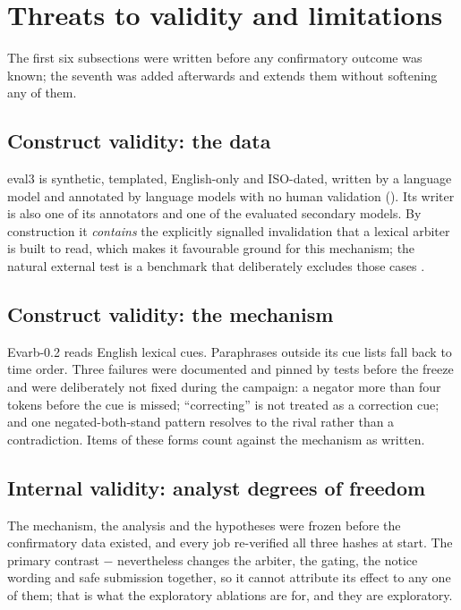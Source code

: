 \section{Threats to validity and limitations}
\label{sec:limitations}

The first six subsections were written before any confirmatory outcome was known; the seventh was added
afterwards and extends them without softening any of them.

\subsection{Construct validity: the data}

eval3 is synthetic, templated, English-only and ISO-dated, written by a language model and annotated by language
models with no human validation (). Its writer is also one of its annotators and one of the
evaluated secondary models. By construction it \emph{contains} the explicitly signalled invalidation that a lexical
arbiter is built to read, which makes it favourable ground for this mechanism; the natural external test is a
benchmark that deliberately excludes those cases \citep{chao2026stale}.

\subsection{Construct validity: the mechanism}

Evarb-0.2 reads English lexical cues. Paraphrases outside its cue lists fall back to time order. Three failures
were documented and pinned by tests before the freeze and were deliberately not fixed during the campaign: a
negator more than four tokens before the cue is missed; ``correcting'' is not treated as a correction cue; and one
negated-both-stand pattern resolves to the rival rather than a contradiction. Items of these forms count against
the mechanism as written.

\subsection{Internal validity: analyst degrees of freedom}

The mechanism, the analysis and the hypotheses were frozen before the confirmatory data existed, and every job
re-verified all three hashes at start. The primary contrast  $-$  nevertheless changes the
arbiter, the gating, the notice wording and safe submission together, so it cannot attribute its effect to any one
of them; that is what the exploratory ablations are for, and they are exploratory.

